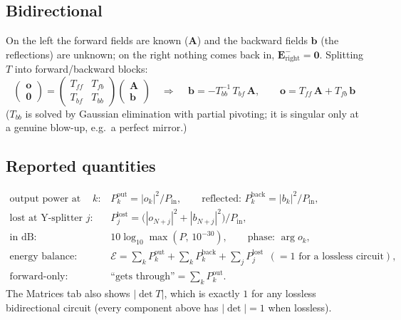 \documentclass[10pt,a4paper]{article}
\begin{document}
\subsection{Bidirectional}
On the left the forward fields are known ($\mathbf{A}$) and the backward fields $\mathbf{b}$ (the reflections) are unknown; on the
right nothing comes back in, $\mathbf{E}^{-}_{\text{right}} = \mathbf{0}$. Splitting $T$ into forward/backward blocks:
\[
  \begin{pmatrix}\mathbf{o}\\ \mathbf{0}\end{pmatrix} =
  \begin{pmatrix} T_{ff} & T_{fb}\\ T_{bf} & T_{bb}\end{pmatrix}
  \begin{pmatrix}\mathbf{A}\\ \mathbf{b}\end{pmatrix}
  \quad\Longrightarrow\quad
  \boxed{\,\mathbf{b} = -T_{bb}^{-1}\,T_{bf}\,\mathbf{A},\qquad
  \mathbf{o} = T_{ff}\,\mathbf{A} + T_{fb}\,\mathbf{b}\,}
\]
($T_{bb}$ is solved by Gaussian elimination with partial pivoting; it is singular only at a genuine blow-up, e.g.\ a perfect mirror.)

\subsection{Reported quantities}
\begin{align*}
  \text{output power at waveguide } k:&\quad P^{\text{out}}_k = |o_k|^2/P_{\text{in}},
  \qquad \text{reflected: } P^{\text{back}}_k = |b_k|^2/P_{\text{in}},\\
  \text{lost at Y-splitter } j:&\quad P^{\text{lost}}_j = \bigl(|o_{N+j}|^2 + |b_{N+j}|^2\bigr)/P_{\text{in}},\\
  \text{in dB:}&\quad 10\log_{10}\max(P,\,10^{-30}),\qquad \text{phase: } \arg o_k,\\
  \text{energy balance:}&\quad \mathcal{E} = \textstyle\sum_k P^{\text{out}}_k + \sum_k P^{\text{back}}_k + \sum_j P^{\text{lost}}_j
  \ \ (=1 \text{ for a lossless circuit}),\\
  \text{forward-only:}&\quad \text{``gets through''} = \textstyle\sum_k P^{\text{out}}_k .
\end{align*}
The Matrices tab also shows $|\det T|$, which is exactly $1$ for any lossless bidirectional circuit (every component above has
$|\det| = 1$ when lossless).
\end{document}
